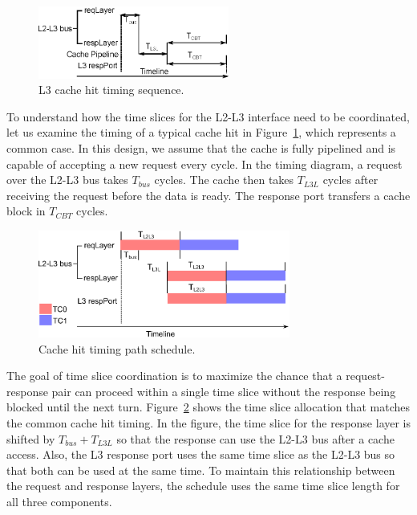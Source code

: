 \begin{figure}
    \begin{center}
        \includegraphics[width=2.4675in]{figs/hit_timing.eps}
        \caption{L3 cache hit timing sequence.}
        \label{fig:hit_timing}
    \end{center}
\end{figure}

To understand how the time slices for the L2-L3 interface need to be coordinated,
let us examine the timing of a typical cache hit in Figure~\ref{fig:hit_timing},
which represents a common case. In this design, we assume that the cache is fully
pipelined and is capable of accepting a new request every cycle.
In the timing diagram, a request over the 
L2-L3 bus takes $T_{bus}$ cycles. The cache then takes $T_{L3L}$ cycles after 
receiving the request before the data is ready.
The response port transfers a cache block in $T_{CBT}$ cycles. 

\begin{figure}
    \begin{center}
        \includegraphics[width=3.2624in]{figs/hit_schedule.eps}
        \caption{Cache hit timing path schedule.}
        \label{fig:hit_schedule}
    \end{center}
\end{figure}

The goal of time slice coordination is to maximize the chance that a
request-response pair can proceed within a single time slice without the
response being blocked until the next turn.
Figure~\ref{fig:hit_schedule} shows the time slice allocation that matches 
the common cache hit timing. 
In the figure, the time slice for the response layer is shifted by
$T_{bus} + T_{L3L}$ so that the response can use the L2-L3 bus after a cache
access. Also, the L3 response port uses the same time slice as the
L2-L3 bus so that both can be used at the same time.
To maintain this relationship between the request and response layers,
the schedule uses the same time slice length for all three components.

